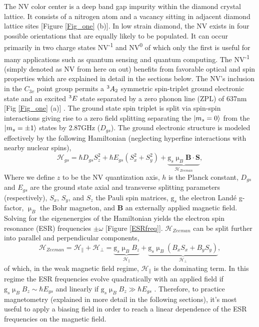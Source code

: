 The NV color center is a deep band gap impurity within the diamond crystal lattice. It consists of a nitrogen atom and a vacancy sitting in adjacent diamond lattice sites [Figure \ref{Fig_one} (b)]. In low strain diamond, the NV exists in four possible orientations that are equally likely to be populated. It can occur primarily in two charge states NV\textsuperscript{-1} and NV\textsuperscript{0} of which only the first is useful for many applications such as quantum sensing and quantum computing. The NV\textsuperscript{-1} (simply denoted as NV from here on out) benefits from favorable optical and spin properties which are explained in detail in the sections below. The NV's inclusion in the $C_{3v}$ point group permits a $\textsuperscript{3}A_2$ symmetric spin-triplet ground electronic state and an excited $\textsuperscript{3}E$ state separated by a zero phonon line (ZPL) of 637nm [Fig \ref{Fig_one} (a)] \cite{maze2011properties}. The ground state spin triplet is split via spin-spin interactions giving rise to a zero field splitting separating the $\ket{m_s = 0}$ from the $\ket{m_s = \pm 1}$ states by 2.87GHz ($D_{gs}$). 
The ground electronic structure is modeled effectively by the following Hamiltonian (neglecting hyperfine interactions with nearby nuclear spins),
\begin{equation}\label{hamiltonian}
\mathcal{H}_{gs} = \hbar D_{gs}S_z^2+\hbar E_{gs}(S_x^2+S_y^2)+\underbrace{\text{g}_s \upmu_B\textbf{B}\cdot\textbf{S}}_{\mathcal{H}_{Zeeman}}, 
\end{equation}
Where we define $z$ to be the NV quantization axis, $h$ is the Planck constant, $D_{gs}$ and $E_{gs}$ are the ground state axial and transverse splitting parameters (respectively), $S_x$, $S_y$, and $S_z$ the Pauli spin matrices, $\text{g}_s$ the electron Land\'e g-factor, $\upmu_B$ the Bohr magneton, and $\textbf{B}$ an externally applied magnetic field. Solving for the eigenenergies of the Hamiltonian yields the electron spin resonance (ESR) frequencies $\pm \omega$ [Figure \ref{ESRfreq}]. $\mathcal{H}_{Zeeman}$ can be split further into parallel and perpendicular components,
\begin{equation}
\mathcal{H}_{Zeeman} = \mathcal{H}_{\parallel} + \mathcal{H}_{\perp} = \underbrace{\text{g}_s \upmu_{B}B_{z}}_{\mathcal{H}_{\parallel}} + \underbrace{\text{g}_s \upmu_B(B_x S_x + B_y S_y)}_{\mathcal{H}_{\perp}},
\end{equation}
of which, in the weak magnetic field regime, $\mathcal{H}_{\parallel}$ is the dominating term. In this regime the ESR frequencies evolve quadratically with an applied field if $\text{g}_s \upmu_B B_z \sim \hbar E_{gs}$ and linearly if $\text{g}_s \upmu_B B_z \gg \hbar E_{gs}$ \cite{rondin2014magnetometry}. Therefore, to practice magnetometry (explained in more detail in the following sections), it's most useful to apply a biasing field in order to reach a linear dependence of the ESR frequencies on the magnetic field. 


